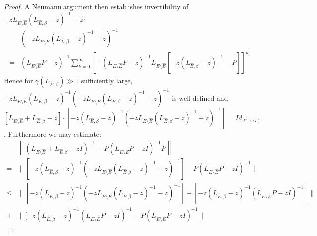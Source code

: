 \documentclass[reqno,12pt,letterpaper]{amsart}
\numberwithin{equation}{section}
\newcommand{\1}{\mathds{1}}
\theoremstyle{definition}
\begin{document}
\begin{proof}
 A Neumann argument then establishes invertibility of $-z L_{E \setminus \hat{E}} (L_{\hat{E},\beta} -z)^{-1} - z$:
\begin{align}
	&(-z L_{E \setminus \hat{E}} (L_{\hat{E},\beta} -z)^{-1} - z)^{-1}\\
	 = &(L_{E \setminus \hat{E}} P -z )^{-1} \sum\limits_{k = 0}^{\infty} [-(L_{E \setminus \hat{E}} P -z )^{-1} L_{E \setminus \hat{E}}  [-z (L_{\hat{E},\beta} -z)^{-1}- P]]^k
\end{align}
Hence for $\gamma(L_{\hat{E},\beta}) \gg 1$ sufficiently large, $-z L_{E \setminus \hat{E}} (L_{\hat{E},\beta} -z)^{-1} (-z L_{E \setminus \hat{E}} (L_{\hat{E},\beta} -z)^{-1} - z)^{-1}$ is well defined and
$
[L_{E \setminus \hat{E}} + L_{\hat{E},\beta} -z]\cdot[-z(L_{\hat{E},\beta} -z)^{-1} (-z L_{E \setminus \hat{E}} (L_{\hat{E},\beta} -z)^{-1} - z)^{-1}] = Id_{\ell^2(G)}$.
Furthermore we may estimate:
\begin{align}
	&\left\| (L_{E \setminus \hat{E}} + L_{\hat{E},\beta} - z I)^{-1} - P ( L_{E \setminus \hat{E}} P - z I)^{-1} P \right\|\\
	=& \| [-z(L_{\hat{E},\beta} -z)^{-1} (-z L_{E \setminus \hat{E}} (L_{\hat{E},\beta} -z)^{-1} - z)^{-1}] -  P ( L_{E \setminus \hat{E}} P - z I)^{-1}    \| \\
	\leq &     
	\| [-z(L_{\hat{E},\beta} -z)^{-1} (-z L_{E \setminus \hat{E}} (L_{\hat{E},\beta} -z)^{-1} - z)^{-1}] -  [-z(L_{\hat{E},\beta} -z)^{-1}( L_{E \setminus \hat{E}} P - z I)^{-1} ]   \| \\
	+& \| [-z(L_{\hat{E},\beta} -z)^{-1}( L_{E \setminus \hat{E}} P - z I)^{-1}  -  P ( L_{E \setminus \hat{E}} P - z I)^{-1}    \|
\end{align}


\end{proof}
\end{document}
